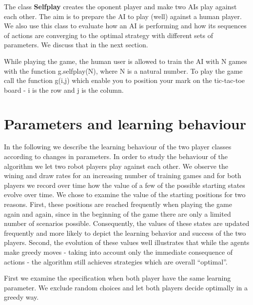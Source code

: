 \documentclass[fleqn]{article}
\begin{document}
The class  \textbf{Selfplay} creates the oponent player and make two AIs play against each other. The aim is to prepare the AI to play (well) against a human player. We also use this class to evaluate how an AI is performing and how its sequences of actions are converging to the optimal strategy with different sets of parameters. We discuss that in the next section.

While playing the game, the human user is allowed to train the AI with N games with the function g.selfplay(N), where N is a natural number. To play the game call the function g(i,j) which enable you to position your mark on the tic-tac-toe board - i is the row and j is the column.

\section{Parameters and learning behaviour}

In the following we describe the learning behaviour of the two player classes according to changes in parameters. 
In order to study the behaviour of the algorithm we let two robot players play against each other. We observe the wining and draw rates for an increasing number of training games and for both players we record over time how the value of a few of the possible starting states evolve over time. We chose to examine the value of the starting positions for two reasons. First, these positions are reached frequently when playing the game again and again, since in the beginning of the game there are only a limited number of scenarios possible. Consequently, the values of these states are updated frequently and more likely to depict the learning behavior and success of the two players. Second, the evolution of these values well illustrates that while the agents make greedy moves - taking into account only the immediate consequence of actions - the algorithm still achieves strategies which are overall “optimal”. 

First we examine the specification when both player have the same learning parameter. We exclude random choices and let both players decide optimally in a greedy way.\\
\end{document}
